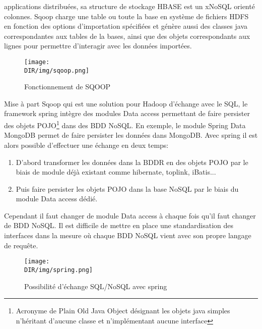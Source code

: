 applications distribuées, sa structure de stockage \textsf{HBASE} est
un x\textsf{NoSQL} orienté colonnes. \textsf{Sqoop} charge
une table ou toute la base en système de fichiers \textsf{HDFS} en
fonction des options d'importation spécifiées et génère aussi des
classes \textsf{java} correspondantes aux tables de la bases, ainsi
que des objets correspondants aux lignes pour permettre d'interagir
avec les données importées.
\begin {figure}[H]
       \centering
        \texttt{[image: \\DIR/img/sqoop.png]}	
        \caption{Fonctionnement de \textsf{SQOOP}}
	\label{sqoop}
  \end {figure}    
\noindent
Mise à part \textsf{Sqoop} qui est une solution pour \textsf{Hadoop}
d'échange avec le \textsf{SQL}, le framework
\textsf{spring} intègre des modules \textsf{Data access}\cite{springsource} permettant 
de faire persister des objets \textsf{POJO}\footnote{Acronyme de \textsf{P}lain \textsf{O}ld \textsf{J}ava \textsf{O}bject désignant les objets java simples n'héritant d'aucune classe et n'implémentant aucune interface } dans des \textsf{BDD NoSQL}. 
En exemple, le module \textsf{Spring Data MongoDB} permet de faire persister
les données dans \textsf{MongoDB}. Avec \textsf{spring} il est alors possible
d'effectuer une échange en deux temps:
\begin{enumerate}
\item D'abord transformer les données dans la \textsf{BDDR} en des objets 
      \textsf{POJO} par le biais de module déjà existant
      comme \textsf{hibernate, toplink, iBatis}...
\item Puis faire persister les objets \textsf{POJO} dans la base \textsf{NoSQL} par le biais du module 
      \textsf{Data access} dédié.    
\end{enumerate} 
Cependant il faut changer de module \textsf{Data access} à chaque fois
qu'il faut changer de \textsf{BDD NoSQL}. Il est difficile de mettre
en place une standardisation des interfaces dans la mesure où
chaque \textsf{BDD NoSQL} vient avec son propre langage de requête.
\begin {figure}[H]
       \centering
        \texttt{[image: \\DIR/img/spring.png]}	
        \caption{Possibilité d'échange \textsf{SQL/NoSQL} avec \textsf{spring}}
	\label{spring}
\end {figure}
